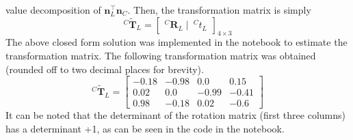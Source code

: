 \documentclass[10pt]{article}
\begin{document}
\begin{enumerate}
        value decomposition of $\mathbf{n}_{L}^{\top} \mathbf{n}_{C}$. Then, the
        transformation matrix is simply
        \begin{equation*}
            ^{C} \mathbf{\tilde{T}}_{L} = \begin{bmatrix} ^{C}
                \mathbf{R}_{L} \mid \ ^{C} t_{L}
            \end{bmatrix}_{4 \times 3}
        \end{equation*}
        The above closed form solution was implemented in the notebook to estimate the
        transformation matrix. The following transformation matrix was obtained
        (rounded off to two decimal places for brevity).
        \begin{equation*}
            ^{C} \mathbf{\tilde{T}}_{L} = \begin{bmatrix}
                -0.18 & -0.98 & 0.0 & 0.15 \\
                0.02 & 0.0 & -0.99 & -0.41 \\
                0.98 & -0.18 & 0.02 & -0.6
            \end{bmatrix}
        \end{equation*}
        It can be noted that the determinant of the rotation matrix (first three columns)
        has a determinant +1, as can be seen in the code in the notebook.


\end{enumerate}
\end{document}
